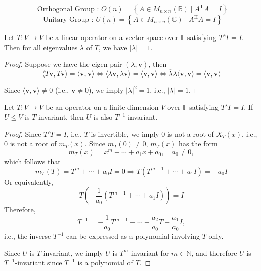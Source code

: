 \begin{definition}
\[
\text{ Orthogonal Group : }O\left( {n}\right)  = \left\{  {A \in  {M}_{n \times  n}\left( \mathbb{R}\right)  \mid  {A}^{\mathrm{T}}A = I}\right\}
\]
\[
\text{ Unitary Group : }U\left( n\right)  = \left\{  {A \in  {M}_{n \times  n}\left( \mathbb{C}\right)  \mid  {A}^{\mathrm{H}}A = I}\right\}
\]
\end{definition}


\begin{proposition}
Let \( T : V \rightarrow V \) be a linear operator on a vector space over \( \mathbb{F} \) satisfying \( T' T = I \). Then for all eigenvalues \( \lambda \) of \( T \), we have \( |\lambda| = 1 \).
\end{proposition}

\begin{proof}
Suppose we have the eigen-pair \( (\lambda, \mathbf{v}) \), then
\[
\langle T\mathbf{v}, T\mathbf{v} \rangle = \langle \mathbf{v}, \mathbf{v} \rangle 
\Leftrightarrow \langle \lambda \mathbf{v}, \lambda \mathbf{v} \rangle = \langle \mathbf{v}, \mathbf{v} \rangle 
\Leftrightarrow \overline{\lambda} \lambda \langle \mathbf{v}, \mathbf{v} \rangle = \langle \mathbf{v}, \mathbf{v} \rangle
\]

Since \( \langle \mathbf{v}, \mathbf{v} \rangle \neq 0 \) (i.e., \( \mathbf{v} \neq 0 \)), we imply \( |\lambda|^2 = 1 \), i.e., \( |\lambda| = 1 \).
\end{proof}

\begin{proposition}
Let \( T : V \to V \) be an operator on a finite dimension \( V \) over \( \mathbb{F} \) satisfying \( T'T = I \). If \( U \leq V \) is \( T \)-invariant, then \( U \) is also \( T^{-1} \)-invariant.
\end{proposition}

\begin{proof}
Since \( T'T = I \), i.e., \( T \) is invertible, we imply \( 0 \) is not a root of \( X_T(x) \), i.e., \( 0 \) is not a root of \( m_T(x) \). Since \( m_T(0) \neq 0 \), \( m_T(x) \) has the form
\[
m_T(x) = x^m + \cdots + a_1 x + a_0, \quad a_0 \neq 0,
\]
which follows that
\[
m_T(T) = T^m + \cdots + a_0 I = 0 \Rightarrow T \left( T^{m-1} + \cdots + a_1 I \right) = -a_0 I
\]
Or equivalently,
\[
T \left( -\frac{1}{a_0} (T^{m-1} + \cdots + a_1 I) \right) = I
\]
Therefore,
\[
T^{-1} = -\frac{1}{a_0} T^{m-1} - \cdots - \frac{a_2}{a_0} T - \frac{a_1}{a_0} I,
\]
i.e., the inverse \( T^{-1} \) can be expressed as a polynomial involving \( T \) only.

Since \( U \) is \( T \)-invariant, we imply \( U \) is \( T^m \)-invariant for \( m \in \mathbb{N} \), and therefore \( U \) is \( T^{-1} \)-invariant since \( T^{-1} \) is a polynomial of \( T \).
\end{proof}

